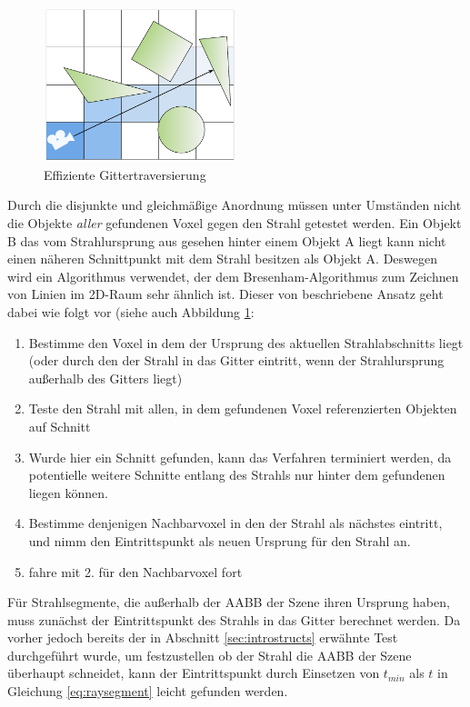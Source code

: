 \begin{figure}\centering
\includegraphics[width=0.5\textwidth]{images/gridtraversal.pdf}
\caption[Effiziente Gittertraversierung]{Effiziente Gittertraversierung}
\label{fig:gridtraversal}
\end{figure}

Durch die disjunkte und gleichmäßige Anordnung müssen unter Umständen nicht die Objekte \textit{aller} gefundenen Voxel gegen den Strahl getestet werden. Ein Objekt B das vom Strahlursprung aus gesehen hinter einem Objekt A liegt kann nicht einen näheren Schnittpunkt mit dem Strahl besitzen als Objekt A. Deswegen wird ein Algorithmus verwendet, der dem Bresenham-Algorithmus zum Zeichnen von Linien im 2D-Raum sehr ähnlich ist. Dieser von \cite{amanatides87} beschriebene Ansatz geht dabei wie folgt vor (siehe auch Abbildung \ref{fig:gridtraversal}:
\begin{enumerate}
 \item Bestimme den Voxel in dem der Ursprung des aktuellen Strahlabschnitts liegt (oder durch den der Strahl in das Gitter eintritt, wenn der Strahlursprung außerhalb des Gitters liegt)
 \item Teste den Strahl mit allen, in dem gefundenen Voxel referenzierten Objekten auf Schnitt 
 \item Wurde hier ein Schnitt gefunden, kann das Verfahren terminiert werden, da potentielle weitere Schnitte entlang des Strahls nur hinter dem gefundenen liegen können.
 \item Bestimme denjenigen Nachbarvoxel in den der Strahl als nächstes eintritt, und nimm den Eintrittspunkt als neuen Ursprung für den Strahl an.
 \item fahre mit 2. für den Nachbarvoxel fort
\end{enumerate}

Für Strahlsegmente, die außerhalb der AABB der Szene ihren Ursprung haben, muss zunächst der Eintrittspunkt des Strahls in das Gitter berechnet werden. Da vorher jedoch bereits der in Abschnitt \ref{sec:introstructs} erwähnte Test durchgeführt wurde, um festzustellen ob der Strahl die AABB der Szene überhaupt schneidet, kann der Eintrittspunkt durch Einsetzen von $t_{min}$ als $t$ in Gleichung \ref{eq:raysegment} leicht gefunden werden.

